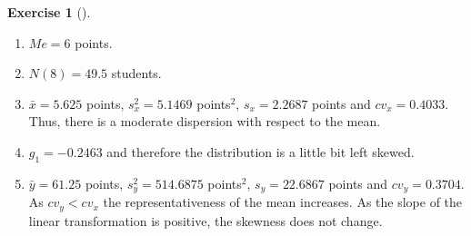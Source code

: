 \documentclass[
  a4paper,
]{scrreport}
\theoremstyle{definition}
\newtheorem{exercise}{Exercise}[chapter]
\theoremstyle{remark}
\begin{document}
\begin{exercise}[]
\begin{tcolorbox}
\begin{enumerate}
\def\labelenumi{\alph{enumi}.}
\setcounter{enumi}{1}
\item
  \(Me = 6\) points.
\item
  \(N(8) = 49.5\) students.
\item
  \(\bar x = 5.625\) points, \(s_x^2=5.1469\) points\(^2\),
  \(s_x=2.2687\) points and \(cv_x=0.4033\). Thus, there is a moderate
  dispersion with respect to the mean.
\item
  \(g_1 = -0.2463\) and therefore the distribution is a little bit left
  skewed.
\item
  \(\bar y = 61.25\) points, \(s_y^2=514.6875\) points\(^2\),
  \(s_y=22.6867\) points and \(cv_y=0.3704\). As \(cv_y < cv_x\) the
  representativeness of the mean increases. As the slope of the linear
  transformation is positive, the skewness does not change.
\end{enumerate}

\end{tcolorbox}

\end{exercise}
\end{document}
